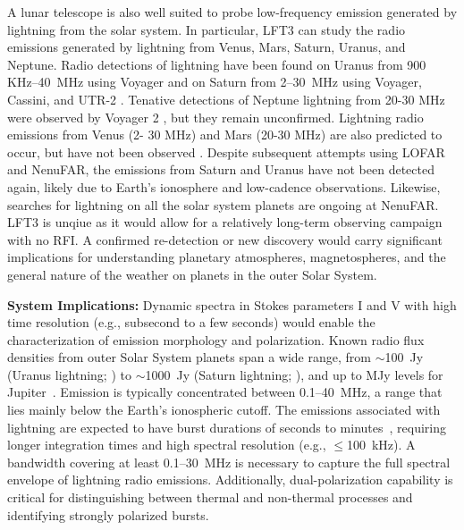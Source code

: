 A lunar telescope is also well suited to probe low-frequency emission generated by lightning from the solar system. In particular, LFT3 can study the radio emissions generated by lightning from Venus, Mars, Saturn, Uranus, and Neptune. Radio detections of lightning have been found on Uranus from 900 KHz--40~MHz using Voyager \citep{1986Zarka_Emission} and on Saturn from 2--30~MHz using Voyager, Cassini, and UTR-2 \citep{Zarka2004}. Tenative detections of Neptune lightning from 20-30 MHz were observed by Voyager 2 \citep{Kaiser1991}, but they remain unconfirmed. Lightning radio emissions from Venus (2- 30 MHz) and Mars (20-30 MHz) are also predicted to occur, but have not been observed \citep{Zarka2008}. Despite subsequent attempts using LOFAR and NenuFAR, the emissions from Saturn and Uranus have not been detected again, likely due to Earth's ionosphere and low-cadence observations. Likewise, searches for lightning on all the solar system planets are ongoing at NenuFAR. LFT3 is unqiue as it would allow for a relatively long-term observing campaign with no RFI. A confirmed re-detection or new discovery would carry significant implications for understanding planetary atmospheres, magnetospheres, and the general nature of the weather on planets in the outer Solar System. 



\textbf{System Implications:} Dynamic spectra in Stokes parameters I and V with high time resolution (e.g., subsecond to a few seconds) would enable the characterization of emission morphology and polarization. Known radio flux densities from outer Solar System planets span a wide range, from $\sim$100~Jy (Uranus lightning; \citealt{1986Zarka_Emission}) to $\sim$1000~Jy (Saturn lightning; \citealt{Zarka2004}), and up to MJy levels for Jupiter~\citep{zarka_auroral_1998,ZHANG199237,Zarka2004}. Emission is typically concentrated between 0.1–40~MHz, a range that lies mainly below the Earth's ionospheric cutoff. The emissions associated with lightning are expected to have burst durations of seconds to minutes~\citep{1986Zarka_Emission}, requiring longer integration times and high spectral resolution (e.g., $\leq$100~kHz). A bandwidth covering at least 0.1–30~MHz is necessary to capture the full spectral envelope of lightning radio emissions. Additionally, dual-polarization capability is critical for distinguishing between thermal and non-thermal processes and identifying strongly polarized bursts.

